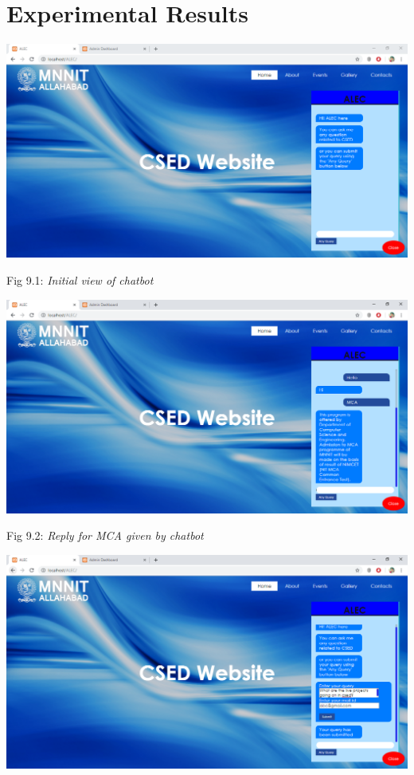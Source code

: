 \documentclass{mnnit}
\begin{document}
\chapter{Experimental Results}
\includegraphics[width=\textwidth]{images/s1.png}
\begin{center}
Fig 9.1: \emph{Initial view of chatbot}
\end{center}
\includegraphics[width=\textwidth]{images/s2.png}
\begin{center}
Fig 9.2: \emph{Reply for MCA given by chatbot}
\end{center}
\includegraphics[width=\textwidth]{images/s3.png}
\end{document}
